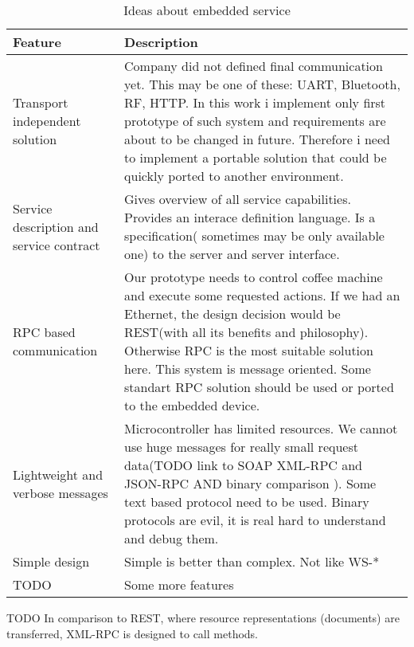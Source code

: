 \begin{table}[h]
	\centering	
	\begin{tabularx}{\textwidth}{|X|X|}
		\hline
		\textbf{Feature} & 
		\textbf{Description}  	&
	    \tabularnewline
		\hline
		Transport independent solution
		&
		Company did not defined final communication yet.
		This may be one of these: UART, Bluetooth, RF, HTTP.
		In this work i implement only first prototype of such system and 
		requirements are about to be changed in future. 
		Therefore i need to implement a portable solution that could be quickly ported
		to another environment.
		
		\tabularnewline
		\hline
			Service description and service contract &
			Gives overview of all service capabilities. \newline 
			Provides an interace definition language. \newline
			Is a specification( sometimes may be only available one) to the server and
			server interface.
	 
	    \tabularnewline
		\hline	
	    RPC based communication &
	    Our prototype needs to control coffee machine and execute some requested
	    actions. If we had an Ethernet, the design decision would be REST(with all
	    its benefits and philosophy).
	    Otherwise RPC is the most suitable solution here. This system is message
	    oriented. Some standart RPC solution should be used or ported to the
	    embedded device.
	    
	    \tabularnewline
		\hline	
		Lightweight and verbose messages &
		Microcontroller has limited resources. We cannot use huge messages for really
		small request data(TODO link to SOAP XML-RPC and JSON-RPC AND binary
		comparison ).
		Some text based protocol need to be used.
		Binary protocols are evil, it is real hard to understand and debug them.
		
	    \tabularnewline
		\hline
		Simple design &
		Simple is better than complex. \newline
		Not like WS-*
		\tabularnewline
		\hline
		TODO &
		Some more features	
		\tabularnewline
		\hline	  
	\end{tabularx} 
	\caption{Ideas about embedded service}
	\label{tbl:service_ideas}
\end{table}


TODO
 In comparison to REST, where resource
representations (documents) are transferred, XML-RPC is designed to call methods.

